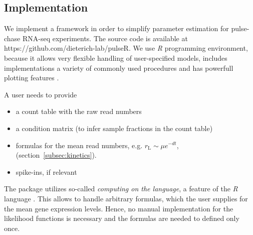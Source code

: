 \subsection{Implementation}
We implement a framework in order  to simplify parameter estimation for 
pulse-chase RNA-seq experiments. The source code is available 
at {https://github.com/dieterich-lab/pulseR}.
We use \emph{R} programming environment, 
because it allows very flexible handling of user-specified models, 
includes implementations a variety of commonly used procedures and 
has powerfull plotting features \citep{rlang}.
\par A user needs to provide
\begin{itemize}
 \item a count table with the raw read numbers
 \item a condition matrix (to infer sample fractions in the count table)
 \item formulas for the mean read numbers, e.g. 
 $r_\text{L}\sim \mu e^{-dt}$, (section~\ref{subsec:kinetics}).
 \item spike-ins, if relevant
\end{itemize}
The package utilizes so-called \emph{computing on the language},
a feature of the \emph{R} language \citep{team2000r}.
This allows to handle arbitrary formulas, which the user supplies for 
the mean gene expression levels. Hence, no manual 
implementation for the likelihood functions is necessary and the 
formulas are needed to defined only once.
